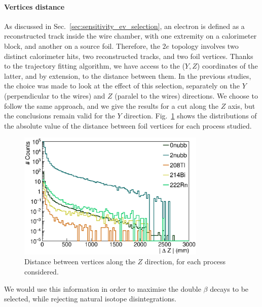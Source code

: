 \paragraph{Vertices distance}
As discussed in Sec.~\ref{sec:sensitivity_ev_selection}, an electron is defined as a reconstructed track inside the wire chamber, with one extremity on a calorimeter block, and another on a source foil.
Therefore, the $2e$ topology involves two distinct calorimeter hits, two reconstructed tracks, and two foil vertices.
Thanks to the trajectory fitting algorithm, we have access to the ($Y,Z$) coordinates of the latter, and by extension, to the distance between them.
In the previous studies, the choice was made to look at the effect of this selection, separately on the $Y$ (perpendicular to the wires) and $Z$ (paralel to the wires) directions.
We choose to follow the same approach, and we give the results for a cut along the $Z$ axis, but the conclusions remain valid for the $Y$ direction.
Fig.~\ref{fig:vertex_dist} shows the distributions of the absolute value of the distance between foil vertices for each process studied.
\begin{figure}[h]
  \centering
  \includegraphics[width=0.8\textwidth]{Sensitivity/fig_sensitivity/Vertex_distance.eps}
  \caption{Distance between vertices along the $Z$ direction, for each process considered.
    \label{fig:vertex_dist}}
\end{figure}
We would use this information in order to maximise the double $\beta$ decays to be selected, while rejecting natural isotope disintegrations.


